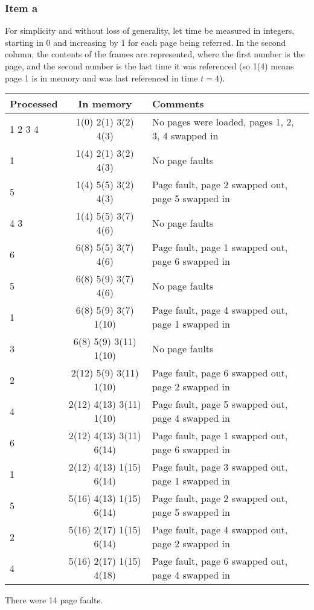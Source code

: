 {\subsubsection{Item a}
For simplicity and without loss of generality, let time be measured in integers, starting in $0$ and increasing by $1$ for each page being referred. In the second column, the contents of the frames are represented, where the first number is the page, and the second number is the last time it was referenced (so 1(4) means page 1 is in memory and was last referenced in time $t=4$).
\begin{center}
\begin{tabular}{l | c | l}
    \textbf{Processed} & \textbf{In memory} & \textbf{Comments} \\ \hline
    1 2 3 4            & 1(0) 2(1) 3(2) 4(3)     & No pages were loaded, pages 1, 2, 3, 4 swapped in \\
    1                  & 1(4) 2(1) 3(2) 4(3)     & No page faults \\
    5                  & 1(4) 5(5) 3(2) 4(3)     & Page fault, page 2 swapped out, page 5 swapped in \\
    4 3                & 1(4) 5(5) 3(7) 4(6)     & No page faults \\
    6                  & 6(8) 5(5) 3(7) 4(6)     & Page fault, page 1 swapped out, page 6 swapped in \\
    5                  & 6(8) 5(9) 3(7) 4(6)     & No page faults \\
    1                  & 6(8) 5(9) 3(7) 1(10)    & Page fault, page 4 swapped out, page 1 swapped in \\
    3                  & 6(8) 5(9) 3(11) 1(10)   & No page faults \\
    2                  & 2(12) 5(9) 3(11) 1(10)  & Page fault, page 6 swapped out, page 2 swapped in \\
    4                  & 2(12) 4(13) 3(11) 1(10) & Page fault, page 5 swapped out, page 4 swapped in \\
    6                  & 2(12) 4(13) 3(11) 6(14) & Page fault, page 1 swapped out, page 6 swapped in \\
    1                  & 2(12) 4(13) 1(15) 6(14) & Page fault, page 3 swapped out, page 1 swapped in \\
    5                  & 5(16) 4(13) 1(15) 6(14) & Page fault, page 2 swapped out, page 5 swapped in \\
    2                  & 5(16) 2(17) 1(15) 6(14) & Page fault, page 4 swapped out, page 2 swapped in \\
    4                  & 5(16) 2(17) 1(15) 4(18) & Page fault, page 6 swapped out, page 4 swapped in
\end{tabular}
\end{center}
There were 14 page faults.

}
